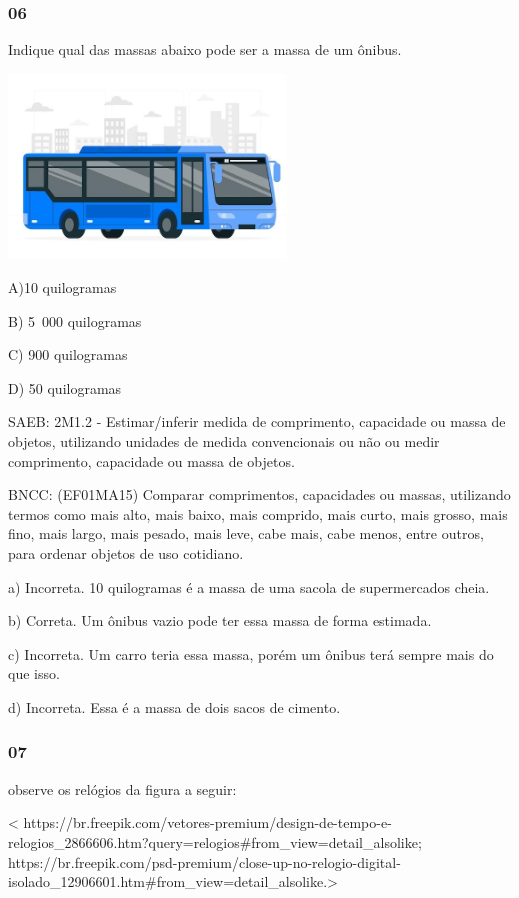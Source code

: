 \subsubsection{06}\label{section-137}

Indique qual das massas abaixo pode ser a massa de um ônibus.

\includegraphics[width=2.90249in,height=1.93351in]{media/image153.jpg}

A)10 quilogramas

B) 5~000 quilogramas

C) 900 quilogramas

D) 50 quilogramas

SAEB: 2M1.2 - Estimar/inferir medida de comprimento, capacidade ou massa
de objetos, utilizando unidades de medida convencionais ou não ou medir
comprimento, capacidade ou massa de objetos.

BNCC: (EF01MA15) Comparar comprimentos, capacidades ou massas,
utilizando termos como mais alto, mais baixo, mais comprido, mais curto,
mais grosso, mais fino, mais largo, mais pesado, mais leve, cabe mais,
cabe menos, entre outros, para ordenar objetos de uso cotidiano.

a) Incorreta. 10 quilogramas é a massa de uma sacola de supermercados
cheia.

b) Correta. Um ônibus vazio pode ter essa massa de forma estimada.

c) Incorreta. Um carro teria essa massa, porém um ônibus terá sempre
mais do que isso.

d) Incorreta. Essa é a massa de dois sacos de cimento.

\subsubsection{07}\label{section-138}

observe os relógios da figura a seguir:

\textless{}
https://br.freepik.com/vetores-premium/design-de-tempo-e-relogios\_2866606.htm?query=relogios\#from\_view=detail\_alsolike;
https://br.freepik.com/psd-premium/close-up-no-relogio-digital-isolado\_12906601.htm\#from\_view=detail\_alsolike.\textgreater{}


